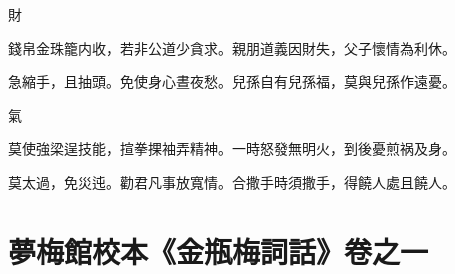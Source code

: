 \hspace*{1em}財

\begin{myquote0}
錢帛金珠籠内收，若非公道少貪求。親朋道義因財失，父子懷情為利休。

急縮手，且抽頭。免使身心晝夜愁。兒孫自有兒孫福，莫與兒孫作遠憂。
\end{myquote0}

\hspace*{1em}氣

\begin{myquote0}
莫使強梁逞技能，揎拳捰袖弄精神。一時怒發無明火，到後憂煎祸及身。

莫太過，免災迍。勸君凡事放寬情。合撒手時須撒手，得饒人處且饒人。
\end{myquote0}

\part*{夢梅館校本《金瓶梅詞話》卷之一}

